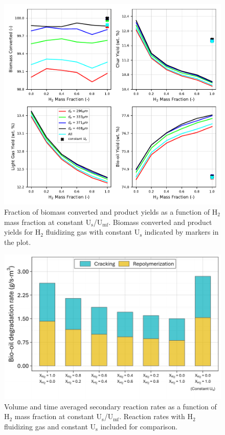 \begin{figure}[H]
    \centering
    \includegraphics[width=\textwidth]{figures/cfd-constuumf-yields.pdf}
    \caption{Fraction of biomass converted and product yields as a function of H$_2$ mass fraction at constant U$_\text{s}$/U$_\text{mf}$. Biomass converted and product yields for H$_2$ fluidizing gas with constant U$_\text{s}$ indicated by markers in the plot.}
    \label{fig:cfd-constuumf-yields}
\end{figure}

\begin{figure}[H]
    \centering
    \includegraphics[width=1.0\textwidth]{figures/cfd-constuumf-reaction-rates.pdf}
    \caption{Volume and time averaged secondary reaction rates as a function of H$_2$ mass fraction at constant U$_\text{s}$/U$_\text{mf}$. Reaction rates with H$_2$ fluidizing gas and constant U$_\text{s}$ included for comparison.}
    \label{fig:cfd-constuumf-reaction-rates}
\end{figure}
